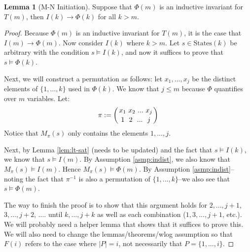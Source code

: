 \documentclass[12pt]{article}
\theoremstyle{definition}
\newtheorem{lemma}{Lemma}
\theoremstyle{remark}
\newcommand{\msp}{\text{ }}
\newcommand{\states}{\text{States}}
\newcommand{\gr}{\text{Gr}}
\newcommand{\perm}{\genfrac{}{}{0pt}{}}
\begin{document}
\begin{lemma}[M-N Initiation]
  Suppose that $\Phi(m)$ is an inductive invariant for $T(m)$, then $I(k) \rightarrow \Phi(k)$ for all $k>m$.
\end{lemma}
\begin{proof}
  Because $\Phi(m)$ is an inductive invariant for $T(m)$, it is the case that $I(m) \rightarrow \Phi(m)$.  Now consider $I(k)$ where $k>m$.  Let $s \in \states(k)$ be arbitrary with the condition $s \models I(k)$, and now it suffices to prove that $s \models \Phi(k)$.  

  Next, we will construct a permutation as follows: let $x_1,...,x_j$ be the distinct elements of $\{1,...,k\}$ used in $\Phi(k)$.  We know that $j \leq m$ because $\Phi$ quantifies over $m$ variables.  Let:
  $$\pi := \left( \perm{x_1 \msp x_2 \msp ... \msp x_j}{1 \msp\msp 2 \msp\msp ... \msp\msp j} \right)$$
  Notice that $M_\pi(s)$ only contains the elements $1,...,j$.  

  Next, by Lemma \ref{lem:lt-sat} (needs to be updated) and the fact that $s \models I(k)$, we know that $s \models I(m)$.  By Assumption \ref{asmp:indist}, we also know that $M_\pi(s) \models I(m)$.  Hence $M_\pi(s) \models \Phi(m)$.  By Assumption \ref{asmp:indist}--noting the fact that $\pi^{-1}$ is also a permutation of $\{1,...,k\}$--we also see that $s \models \Phi(m)$.  

  The way to finish the proof is to show that this argument holds for $2,...,j+1$, $3,...,j+2$, .... until $k,...,j+k$ as well as each combination ($1,3,...,j+1$, etc.).  We will probably need a helper lemma that shows that it suffices to prove this.  We will also need to change the lemmas/theorems/wlog assumption so that $F(i)$ refers to the case where $|P|=i$, not necessarily that $P=\{1,...,i\}$.




\end{proof}
\end{document}
